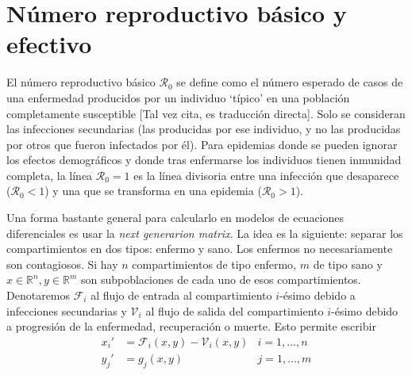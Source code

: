\section{Número reproductivo básico y efectivo}\label{sec:R0}


El número reproductivo básico \(\mathcal{R}_0\) se define como el número esperado de casos de una enfermedad producidos por un individuo `típico' en una población completamente susceptible [Tal vez cita, es traducción directa]. Solo se consideran las infecciones secundarias (las producidas por ese individuo, y no las producidas por otros que fueron infectados por él). Para epidemias donde se pueden ignorar los efectos demográficos y donde tras enfermarse los individuos tienen inmunidad completa, la línea \(\mathcal{R}_0=1\) es la línea divisoria entre una infección que desaparece (\(\mathcal{R}_0<1\)) y una que se transforma en una epidemia (\(\mathcal{R}_0>1\)).

Una forma bastante general para calcularlo en modelos de ecuaciones diferenciales es usar la \textit{next generarion matrix}. La idea es la siguiente: separar los compartimientos en dos tipos: enfermo y sano. Los enfermos no necesariamente son contagiosos. Si hay \(n\) compartimientos de tipo enfermo, \(m\) de tipo sano y \(x \in \mathbb{R}^n, y \in \mathbb{R}^m\) son subpoblaciones de cada uno de esos compartimientos. Denotaremos \(\mathcal{F}_i\) al flujo de entrada al compartimiento \(i\)-ésimo debido a infecciones secundarias y \(\mathcal{V}_i\) al flujo de salida del compartimiento \(i\)-ésimo debido a progresión de la enfermedad, recuperación o muerte. Esto permite escribir 
\begin{equation}
\label{model-flows}
\begin{aligned}
x_i' &= \mathcal{F}_i(x,y) - \mathcal{V}_i(x,y) & i = 1, \dots, n \\ 
y_j' &= g_j(x,y) & j = 1, \dots, m
\end{aligned}
\end{equation}

